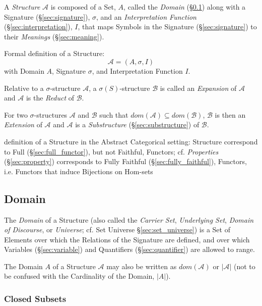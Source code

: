 A \emph{Structure} $\mathcal{A}$ is composed of a Set, $A$, called the
\emph{Domain} (\S\ref{sec:domain}) along with a Signature
(\S\ref{sec:signature}), $\sigma$, and an \emph{Interpretation
  Function} (\S\ref{sec:interpretation}), $I$, that maps Symbols in
the Signature (\S\ref{sec:signature}) to their \emph{Meanings}
(\S\ref{sec:meaning}).

Formal definition of a Structure:
\[
  \mathcal{A} = (A, \sigma, I)
\]
with Domain $A$, Signature $\sigma$, and Interpretation Function $I$.

Relative to a $\sigma$-structure $\mathcal{A}$, a
$\sigma(S)$-structure $\mathcal{B}$ is called an \emph{Expansion} of
$\mathcal{A}$ and $\mathcal{A}$ is the \emph{Reduct} of $\mathcal{B}$.

For two $\sigma$-structures $\mathcal{A}$ and $\mathcal{B}$ such that
$dom(\mathcal{A}) \subseteq dom(\mathcal{B})$, $\mathcal{B}$ is then
an \emph{Extension} of $\mathcal{A}$ and $\mathcal{A}$ is a
\emph{Substructure} (\S\ref{sec:substructure}) of $\mathcal{B}$.

definition of a Structure in the Abstract Categorical setting: Structure
correspond to Full (\S\ref{sec:full_functor}), but not Faithful, Functors; cf.
\emph{Properties} (\S\ref{sec:property}) corresponds to Fully Faithful
(\S\ref{sec:fully_faithful}), Functors, i.e. Functors that induce Bijections on
Hom-sets



\subsection{Domain}\label{sec:domain}

The \emph{Domain} of a Structure (also called the \emph{Carrier Set},
\emph{Underlying Set}, \emph{Domain of Discourse}, or \emph{Universe};
cf. Set Universe \S\ref{sec:set_universe}) is a Set of Elements over
which the Relations of the Signature are defined, and over which
Variables (\S\ref{sec:variable}) and Quantifiers
(\S\ref{sec:quantifier}) are allowed to range.

The Domain $A$ of a Structure $\mathcal{A}$ may also be written as
$dom(\mathcal{A})$ or $|\mathcal{A}|$ (not to be confused with the
Cardinality of the Domain, $|A|$).



\subsubsection{Closed Subsets}\label{sec:closed_subset}

